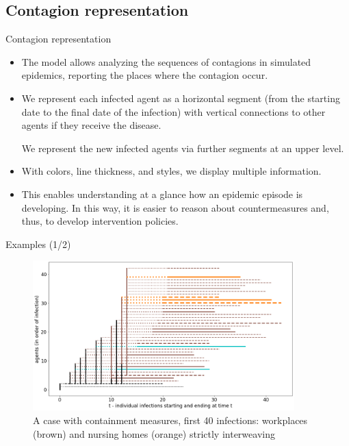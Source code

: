 \documentclass[9pt]{beamer}
\begin{document}
\subsection{Contagion representation}

\begin{frame}{Contagion representation}

  \begin{itemize}
  \item
The model allows analyzing the sequences of contagions in simulated epidemics, reporting the places where the contagion occur. 
  \item
We represent each infected agent as a horizontal segment (from the starting date to the final date of the infection) with vertical connections to other agents if they receive the disease.

We represent the new infected agents via further segments at an upper level. 

  \item
With colors, line thickness, and styles, we display multiple information. 

  \item
This enables understanding at a glance how an epidemic episode is developing. In this way, it is easier to reason about countermeasures and, thus, to develop intervention policies.

  \end{itemize}
\end{frame}


\begin{frame}{Examples (1/2)}

\begin{figure}[H]
\center
\includegraphics[width=0.9\textwidth]{with8b40.png}%
\caption{A case with containment measures, first 40 infections: workplaces (brown) and nursing homes (orange) strictly interweaving}
\label{workplacesNursingHomes}
\end{figure}
\end{frame}
\end{document}
